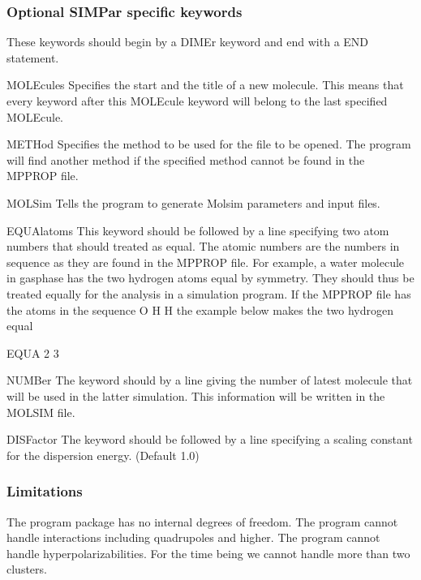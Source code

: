 \subsubsection{Optional SIMPar specific keywords}
These keywords should begin by a DIMEr keyword and end with a END statement.
\begin{keywordlist}
\item[MOLEcules]
Specifies the start and the title of a new molecule. This means that every keyword after this
MOLEcule keyword will belong to the last specified MOLEcule.
\item[METHod]
Specifies the method to be used for the file to be opened.
The program will find another method if the specified method
cannot be found in the MPPROP file.
\item[MOLSim]
Tells the program to generate Molsim  parameters and input files.
\item[EQUAlatoms]
This keyword should be followed by a line specifying two atom numbers that should treated as equal.
The atomic numbers are the numbers in sequence as they are found in the MPPROP file.
For example, a water molecule in gasphase has the two hydrogen atoms equal by symmetry.
They should thus be treated equally for the analysis in a simulation program. If the
MPPROP file has the atoms in the sequence O H H the example below makes the two hydrogen equal
\begin{inputlisting}
EQUA
2 3
\end{inputlisting}
\item[NUMBer]
The keyword should by a line giving the number of latest molecule that will
be used in the latter simulation. This information will be written in the MOLSIM file.
\item[DISFactor]
The keyword should be followed by a line specifying a scaling constant for the dispersion energy. (Default 1.0)
\end{keywordlist}

\subsubsection{Limitations}
The program package has no internal degrees of freedom.
The program cannot handle interactions including quadrupoles and higher.
The program cannot handle hyperpolarizabilities. For the time being we cannot handle more than two clusters.

